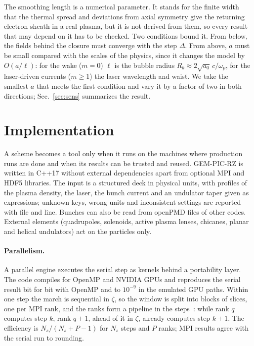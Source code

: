 \documentclass[preprint,12pt]{elsarticle}
\begin{document}
The smoothing length is a numerical parameter. It stands for the finite width that the thermal spread and deviations from axial symmetry give the returning electron sheath in a real plasma, but it is not derived from them, so every result that may depend on it has to be checked. Two conditions bound it. From below, the fields behind the closure must converge with the step $\Delta$. From above, $a$ must be small compared with the scales of the physics, since it changes the model by $O(a/\ell)$: for the wake ($m = 0$) $\ell$ is the bubble radius $R_b \approx 2\sqrt{a_0}\,c/\omega_p$, for the laser-driven currents ($m \ge 1$) the laser wavelength and waist. We take the smallest $a$ that meets the first condition and vary it by a factor of two in both directions; Sec.~\ref{sec:sens} summarizes the result.


\section{Implementation}\label{sec:impl}

A scheme becomes a tool only when it runs on the machines where production runs are done and when its results can be trusted and reused. GEM-PIC-RZ is written in C++17 without external dependencies apart from optional MPI and HDF5 libraries. The input is a structured deck in physical units, with profiles of the plasma density, the laser, the bunch current and an undulator taper given as expressions; unknown keys, wrong units and inconsistent settings are reported with file and line. Bunches can also be read from openPMD files of other codes. External elements (quadrupoles, solenoids, active plasma lenses, chicanes, planar and helical undulators) act on the particles only.

\paragraph*{Parallelism.} A parallel engine executes the serial step as kernels behind a portability layer. The code compiles for OpenMP and NVIDIA GPUs and reproduces the serial result bit for bit with OpenMP and to $10^{-9}$ in the emulated GPU paths. Within one step the march is sequential in $\zeta$, so the window is split into blocks of slices, one per MPI rank, and the ranks form a pipeline in the steps~\cite{Feng2009}: while rank $q$ computes step $k$, rank $q+1$, ahead of it in $\zeta$, already computes step $k+1$. The efficiency is $N_s/(N_s + P - 1)$ for $N_s$ steps and $P$ ranks; MPI results agree with the serial run to rounding.
\end{document}
